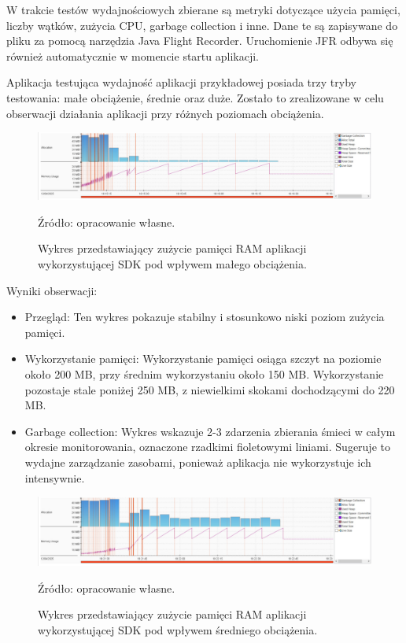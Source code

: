 \documentclass[runningheads,12pt]{llncs}
\begin{document}
W trakcie testów wydajnościowych zbierane są metryki dotyczące użycia pamięci, liczby wątków, zużycia CPU, garbage collection i inne. Dane te są zapisywane do pliku za pomocą narzędzia Java Flight Recorder. Uruchomienie JFR odbywa się również automatycznie w momencie startu aplikacji.

Aplikacja testująca wydajność aplikacji przykładowej posiada trzy tryby testowania: małe obciążenie, średnie oraz duże. Zostało to zrealizowane w celu obserwacji działania aplikacji przy różnych poziomach obciążenia.

\newpage


\begin{figure}
    \includegraphics[width=\linewidth]{images/sdk-memory-low-graph.jpg}
    \caption{Wykres przedstawiający zużycie pamięci  RAM aplikacji wykorzystującej SDK pod wpływem małego obciążenia.} \label{fig1}
    \vspace{0.5em}
    {\small Źródło: opracowanie własne.}
\end{figure}

Wyniki obserwacji:

\begin{itemize}
    \item Przegląd: Ten wykres pokazuje stabilny i stosunkowo niski poziom zużycia pamięci.
    \item Wykorzystanie pamięci: Wykorzystanie pamięci osiąga szczyt na poziomie około 200 MB, przy średnim wykorzystaniu około 150 MB. Wykorzystanie pozostaje stale poniżej 250 MB, z niewielkimi skokami dochodzącymi do 220 MB.
    \item Garbage collection: Wykres wskazuje 2-3 zdarzenia zbierania śmieci w całym okresie monitorowania, oznaczone rzadkimi fioletowymi liniami. Sugeruje to wydajne zarządzanie zasobami, ponieważ aplikacja nie wykorzystuje ich intensywnie.
\end{itemize}

\newpage

\begin{figure}
    \includegraphics[width=\linewidth]{images/sdk-memory-middle-graph.jpg}
    \caption{Wykres przedstawiający zużycie pamięci  RAM aplikacji wykorzystującej SDK pod wpływem średniego obciążenia.} \label{fig1}
    \vspace{0.5em}
    {\small Źródło: opracowanie własne.}
\end{figure}
\end{document}
